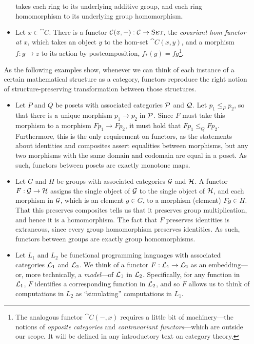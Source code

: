 \begin{ex}
\begin{itemize}
      takes each ring to its underlying additive group, and each ring
      homomorphism to its underlying group homomorphism.
    \item Let $x\in\cat{C}$. There is a functor ${\mathcal{C}}(x, -):
      {\mathcal{C}}\to{\textsc{\text{Set}}}$, the \emph{covariant hom-functor at $x$}, which takes an
      object $y$ to the hom-set $\cat{C}(x, y)$, and a morphism $f: y\to z$ to
      its action by postcomposition, $f_*(g) = fg$\footnote{The analogous functor
        $\cat{C}(-, x)$ requires a little bit of machinery---the notions of
      \emph{opposite categories} and \emph{contravariant functors}---which are
    outside our scope. It will be defined in any introductory text on category
    theory.}.
  \end{itemize}
\end{ex}

\begin{ex}
  As the following examples show, whenever we can think of each instance of a
  certain mathematical structure as a category, functors reproduce the right
  notion of structure-preserving transformation between those structures.
  \begin{itemize}
    \item Let $P$ and $Q$ be posets with associated categories $\mathcal{P}$ and $\mathcal{Q}$. Let
      $p_1\leq_P p_2$, so that there is a unique morphism $p_1\to p_2$ in $\mathcal{P}$. Since
      $F$ must take this morphism to a morphism $Fp_1\to Fp_2$, it must hold that
      $Fp_1\leq_Q Fp_2$. Furthermore, this is the only requirement on functors, as
      the statements about identities and composites assert equalities between
      morphisms, but any two morphisms with the same domain and codomain are equal
      in a poset. As such, functors between posets are exactly monotone maps.
    \item Let $G$ and $H$ be groups with associated categories $\mathcal{G}$ and
      $\mathcal{H}$. A functor $F: \mathcal{G}\to\mathcal{H}$ assigns the single object of $\mathcal{G}$ to the
      single object of $\mathcal{H}$, and each morphism in $\mathcal{G}$, which is an element $g\in
      G$, to a morphism (element) $Fg\in H$. That this preserves composites tells us
      that it preserves group multiplication, and hence it is a homomorphism. The
      fact that $F$ preserves identities is extraneous, since every group
      homomorphism preserves identities. As such, functors between groups are exactly
      group homomorphisms.
    \item Let $L_1$ and $L_2$ be functional programming languages with associated
      categories $\mathcal{L}_1$ and $\mathcal{L}_2$. We think of a functor $F: \mathcal{L}_1\to\mathcal{L}_2$ as an
      embedding---or, more technically, a \emph{model}---of $\mathcal{L}_1$ in $\mathcal{L}_2$.
      Specifically, for any function in $\mathcal{L}_1$, $F$ identifies a corresponding
      function in $\mathcal{L}_2$, and so $F$ allows us to think of computations in $L_2$ as
      ``simulating'' computations in $L_1$.
  \end{itemize}
\end{ex}

